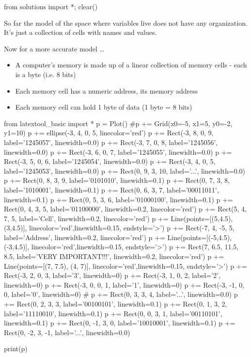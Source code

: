 \begin{python0}
from solutions import *; clear()
\end{python0}

So far the model of the space where variables live does not have any organization. It's just a collection of cells with names and values.

Now for a more accurate model \ldots{}

\begin{itemize}
\item
  A computer's memory is made up of a linear collection of memory cells
  - each is a byte (i.e. 8 bits)
\item
  Each memory cell has a numeric address, its memory address
\item
  Each memory cell can hold 1 byte of data (1 byte = 8 bits)
\end{itemize}

\begin{python}
from latextool_basic import *
p = Plot()
#p += Grid(x0=-5, x1=5, y0=-2, y1=10)
p += ellipse(-3, 4, 0, 5, linecolor='red')
p += Rect(-3, 8, 0, 9, label='1245057', linewidth=0.0)
p += Rect(-3, 7, 0, 8, label='1245056', linewidth=0.0)
p += Rect(-3, 6, 0, 7, label='1245055', linewidth=0.0)
p += Rect(-3, 5, 0, 6, label='1245054', linewidth=0.0)
p += Rect(-3, 4, 0, 5, label='1245053', linewidth=0.0)
p += Rect(0, 9, 3, 10, label='...', linewidth=0.0)
p += Rect(0, 8, 3, 9, label='0101010', linewidth=0.1)
p += Rect(0, 7, 3, 8, label='1010001', linewidth=0.1)
p += Rect(0, 6, 3, 7, label='00011011', linewidth=0.1)
p += Rect(0, 5, 3, 6, label='01000100', linewidth=0.1)
p += Rect(0, 4, 3, 5, label='01100000', linewidth=0.2, linecolor='red')
p += Rect(5, 4, 7, 5, label='Cell', linewidth=0.2, linecolor='red')
p += Line(points=[(5,4.5), (3,4.5)], linecolor='red',linewidth=0.15, endstyle='>')
p += Rect(-7, 4, -5, 5, label='Address', linewidth=0.2, linecolor='red')
p += Line(points=[(-5,4.5),(-3,4.5)], linecolor='red',linewidth=0.15, endstyle='>')
p += Rect(7, 6.5, 11.5, 8.5, label='VERY IMPORTANT!!!', linewidth=0.2, linecolor='red')
p += Line(points=[(7, 7.5), (4, 7)], linecolor='red',linewidth=0.15, endstyle='>')
p += Rect(-3, 2, 0, 3, label='3', linewidth=0)
p += Rect(-3, 1, 0, 2, label='2', linewidth=0)
p += Rect(-3, 0, 0, 1, label='1', linewidth=0)
p += Rect(-3, -1, 0, 0, label='0', linewidth=0)
#
p += Rect(0, 3, 3, 4, label='...', linewidth=0.0)
p += Rect(0, 2, 3, 3, label='00100101', linewidth=0.1)
p += Rect(0, 1, 3, 2, label='11110010', linewidth=0.1)
p += Rect(0, 0, 3, 1, label='00110101', linewidth=0.1)
p += Rect(0, -1, 3, 0, label='10010001', linewidth=0.1)
p += Rect(0, -2, 3, -1, label='...', linewidth=0.0)

print(p)
\end{python}

